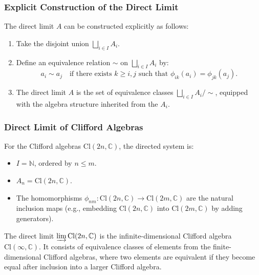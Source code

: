 \documentclass{article}
\begin{document}
\subsubsection{Explicit Construction of the Direct Limit}

The direct limit $A$ can be constructed explicitly as follows:

\begin{enumerate}
\item Take the disjoint union $\bigsqcup_{i \in I} A_i$. 

\item Define an equivalence relation $\sim$ on $\bigsqcup_{i \in I} A_i$ by:
\begin{equation*}
a_i \sim a_j \quad \text{if there exists } k \geq i, j \text{ such that }
\phi_{ik}(a_i) = \phi_{jk}(a_j).  
\end{equation*}

\item The direct limit $A$ is the set of equivalence classes $\bigsqcup_{i
\in I} A_i / \sim$, equipped with the algebra structure inherited from the $%
A_i$.
\end{enumerate}

\subsubsection{Direct Limit of Clifford Algebras}

For the Clifford algebras $\text{Cl}(2n, \mathbb{C})$, the directed system
is:

\begin{itemize}
\item $I = \mathbb{N}$, ordered by $n \leq m$. 

\item $A_n = \text{Cl}(2n, \mathbb{C})$. 

\item The homomorphisms $\phi_{nm}: \text{Cl}(2n, \mathbb{C}) \to \text{Cl}%
(2m, \mathbb{C})$ are the natural inclusion maps (e.g., embedding $\text{Cl}%
(2n, \mathbb{C})$ into $\text{Cl}(2m, \mathbb{C})$ by adding generators).
\end{itemize}

The direct limit $\varinjlim \text{Cl}(2n, \mathbb{C})$ is the
infinite-dimensional Clifford algebra $\text{Cl}(\infty, \mathbb{C})$. It
consists of equivalence classes of elements from the finite-dimensional
Clifford algebras, where two elements are equivalent if they become equal
after inclusion into a larger Clifford algebra.
\end{document}

